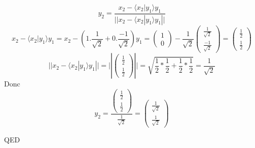 \documentclass[]{book}
\theoremstyle{definition}
\begin{document}
$$y_2 = \frac{x_2- \langle x_2|y_1 \rangle y_1}{||x_2- \langle x_2|y_1 \rangle y_1||}$$
$$x_2 - \langle x_2|y_1 \rangle y_1 = x_2 - (1.\frac{1}{\sqrt{2}} + 0.\frac{-1}{\sqrt{2}} )y_1 =  \begin{pmatrix} 1 \\ 0 \end{pmatrix} - \frac{1}{\sqrt{2}} \begin{pmatrix} \frac{1}{\sqrt{2}}\\ \frac{-1}{\sqrt{2}} \end{pmatrix} = \begin{pmatrix} \frac{1}{2} \\ \frac{1}{2} \end{pmatrix}$$
$$||x_2 - \langle x_2|y_1 \rangle y_1|| = ||\begin{pmatrix} \frac{1}{2} \\ \frac{1}{2} \end{pmatrix}|| = \sqrt{\frac{1}{2}*\frac{1}{2} + \frac{1}{2}*\frac{1}{2}} = \frac{1}{\sqrt{2}}$$
Donc 
$$y_2 = \frac{\begin{pmatrix} \frac{1}{2} \\ \frac{1}{2} \end{pmatrix}}{\frac{1}{\sqrt{2}}} = \begin{pmatrix} \frac{1}{\sqrt{2}} \\ \frac{1}{\sqrt{2}} \end{pmatrix}$$


QED
\end{document}
